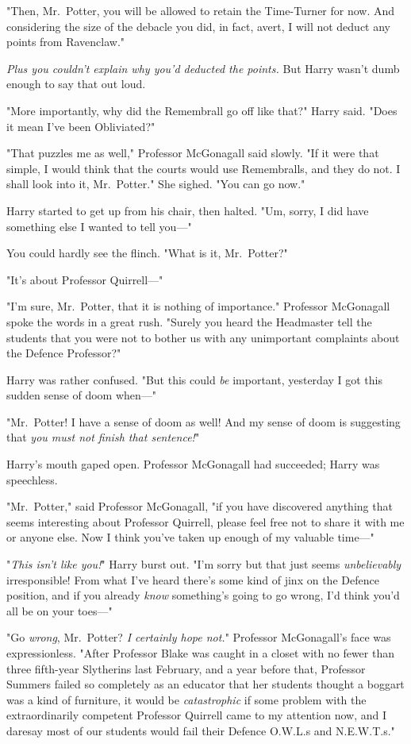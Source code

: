 "Then, Mr.~Potter, you will be allowed to retain the Time-Turner for now. And
considering the size of the debacle you did, in fact, avert, I will not deduct
any points from Ravenclaw."

\emph{Plus you couldn't explain why you'd deducted the points.} But Harry
wasn't dumb enough to say that out loud.

"More importantly, why did the Remembrall go off like that?" Harry said. "Does
it mean I've been Obliviated?"

"That puzzles me as well," Professor McGonagall said slowly. "If it were that
simple, I would think that the courts would use Remembralls, and they do not. I
shall look into it, Mr.~Potter." She sighed. "You can go now."

Harry started to get up from his chair, then halted. "Um, sorry, I did have
something else I wanted to tell you---"

You could hardly see the flinch. "What is it, Mr.~Potter?"

"It's about Professor Quirrell---"

"I'm sure, Mr.~Potter, that it is nothing of importance." Professor McGonagall
spoke the words in a great rush. "Surely you heard the Headmaster tell the
students that you were not to bother us with any unimportant complaints about
the Defence Professor?"

Harry was rather confused. "But this could \emph{be} important, yesterday I got
this sudden sense of doom when---"

"Mr.~Potter! I have a sense of doom as well! And my sense of doom is suggesting
that \emph{you must not finish that sentence!}"

Harry's mouth gaped open. Professor McGonagall had succeeded; Harry was
speechless.

"Mr.~Potter," said Professor McGonagall, "if you have discovered anything that
seems interesting about Professor Quirrell, please feel free not to share it
with me or anyone else. Now I think you've taken up enough of my valuable
time---"

"\emph{This isn't like you!}" Harry burst out. "I'm sorry but that just seems
\emph{unbelievably} irresponsible! From what I've heard there's some kind of
jinx on the Defence position, and if you already \emph{know} something's going
to go wrong, I'd think you'd all be on your toes---"

"Go \emph{wrong}, Mr.~Potter? \emph{I certainly hope not.}" Professor
McGonagall's face was expressionless. "After Professor Blake was caught in a
closet with no fewer than three fifth-year Slytherins last February, and a year
before that, Professor Summers failed so completely as an educator that her
students thought a boggart was a kind of furniture, it would be
\emph{catastrophic} if some problem with the extraordinarily competent
Professor Quirrell came to my attention now, and I daresay most of our students
would fail their Defence O.W.L.s and N.E.W.T.s."

